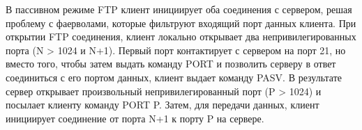 В пассивном режиме FTP клиент инициирует оба соединения с сервером, решая проблему с фаерволами, которые фильтруют входящий порт данных клиента. 
При открытии FTP соединения, клиент локально открывает два непривилегированных порта (N > 1024 и N+1). 
Первый порт контактирует с сервером на порт 21, но вместо того, чтобы затем выдать команду PORT и позволить серверу в ответ соединиться с его портом данных, клиент выдает команду PASV. 
В результате сервер открывает произвольный непривилегированный порт (P > 1024) и посылает клиенту команду PORT P. 
Затем, для передачи данных, клиент инициирует соединение от порта N+1 к порту P на сервере.
